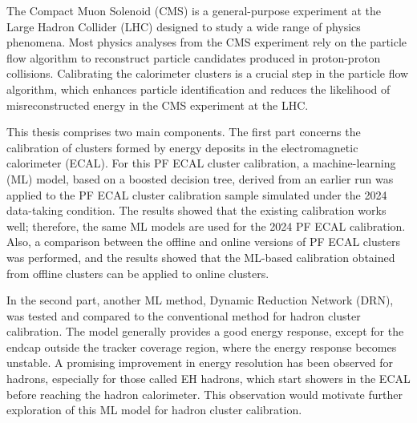 The Compact Muon Solenoid (CMS) is a general-purpose experiment at the Large Hadron Collider (LHC) designed to study a wide range of physics phenomena.
Most physics analyses from the CMS experiment rely on the particle flow algorithm to reconstruct particle candidates produced in proton-proton collisions.
Calibrating the calorimeter clusters is a crucial step in the particle flow algorithm, which enhances particle identification and reduces the likelihood of
misreconstructed energy in the CMS experiment at the LHC.

This thesis comprises two main components. The first part concerns the calibration of clusters formed by energy deposits in the electromagnetic calorimeter (ECAL).
For this PF ECAL cluster calibration, a machine-learning (ML) model, based on a boosted decision tree, derived from an earlier run was applied
to the PF ECAL cluster calibration sample simulated under the 2024 data-taking condition.
The results showed that the existing calibration works well; therefore, the same ML models are used for the 2024 PF ECAL calibration.
Also, a comparison between the offline and online versions of PF ECAL clusters was performed, and the results showed that the ML-based calibration obtained
from offline clusters can be applied to online clusters.

In the second part, another ML method, Dynamic Reduction Network (DRN), was tested and compared to the conventional method for hadron cluster calibration.
The model generally provides a good energy response, except for the endcap outside the tracker coverage region, where the energy response becomes unstable.
A promising improvement in energy resolution has been observed for hadrons, especially for those called EH hadrons, which start showers in the ECAL before reaching the hadron calorimeter. This observation would motivate further exploration of this ML model for hadron cluster calibration.




